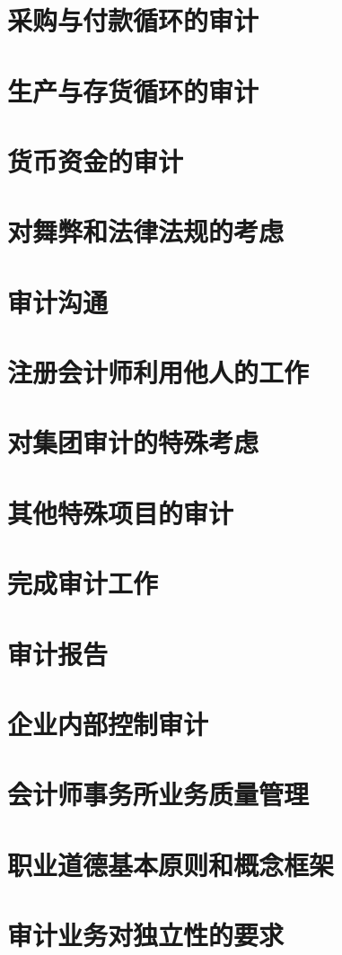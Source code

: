 \documentclass[UTF8,12pt]{ctexart}
\numberwithin{equation}{section} %
\numberwithin{figure}{section}
\numberwithin{table}{section}
\begin{document}
	\newpage
	\section{采购与付款循环的审计}
	
	\newpage
	\section{生产与存货循环的审计}
	
	\newpage
	\section{货币资金的审计}
	
	\newpage
	\section{对舞弊和法律法规的考虑}
	
	\newpage
	\section{审计沟通}
	
	\newpage
	\section{注册会计师利用他人的工作}
	
	\newpage
	\section{对集团审计的特殊考虑}
	
	\newpage
	\section{其他特殊项目的审计}
	
	\newpage
	\section{完成审计工作}
	
	\newpage
	\section{审计报告}
	
	\newpage
	\section{企业内部控制审计}
	
	\newpage
	\section{会计师事务所业务质量管理}
	
	\newpage
	\section{职业道德基本原则和概念框架}
	
	\newpage
	\section{审计业务对独立性的要求}
	

	

	
\end{document}
